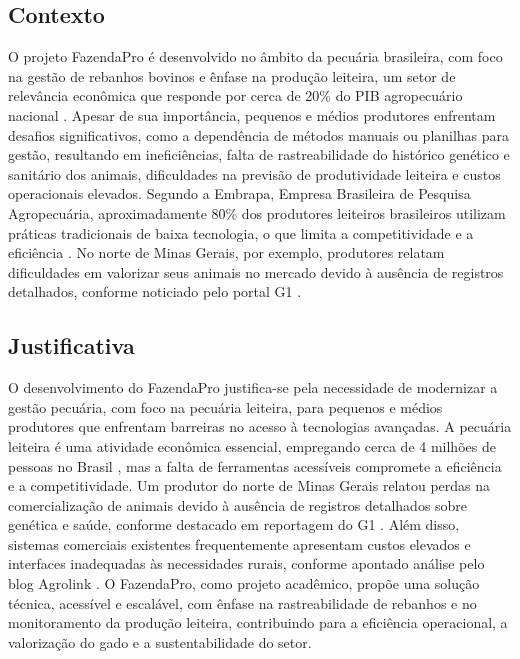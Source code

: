 \documentclass[12pt, a4paper]{article}
\begin{document}
\subsection{Contexto}
\begin{spacing}{1.5}
O projeto FazendaPro é desenvolvido no âmbito da pecuária brasileira, com foco na gestão de rebanhos bovinos e ênfase na produção leiteira, um setor de relevância econômica que responde por cerca de 20\% do PIB agropecuário nacional \cite{agro20}. Apesar de sua importância, pequenos e médios produtores enfrentam desafios significativos, como a dependência de métodos manuais ou planilhas para gestão, resultando em ineficiências, falta de rastreabilidade do histórico genético e sanitário dos animais, dificuldades na previsão de produtividade leiteira e custos operacionais elevados. Segundo a Embrapa, Empresa Brasileira de Pesquisa Agropecuária,  aproximadamente 80\% dos produtores leiteiros brasileiros utilizam práticas tradicionais de baixa tecnologia, o que limita a competitividade e a eficiência \cite{anuario2023}. No norte de Minas Gerais, por exemplo, produtores relatam dificuldades em valorizar seus animais no mercado devido à ausência de registros detalhados, conforme noticiado pelo portal G1 \cite{g12022}.
\end{spacing}

\subsection{Justificativa}
\begin{spacing}{1.5}
O desenvolvimento do FazendaPro justifica-se pela necessidade de modernizar a gestão pecuária, com foco na pecuária leiteira, para pequenos e médios produtores que enfrentam barreiras no acesso à tecnologias avançadas. A pecuária leiteira é uma atividade econômica essencial, empregando cerca de 4 milhões de pessoas no Brasil \cite{4milhao}, mas a falta de ferramentas acessíveis compromete a eficiência e a competitividade. Um produtor do norte de Minas Gerais relatou perdas na comercialização de animais devido à ausência de registros detalhados sobre genética e saúde, conforme destacado em reportagem do G1 \cite{g12022}. Além disso, sistemas comerciais existentes frequentemente apresentam custos elevados e interfaces inadequadas às necessidades rurais, conforme apontado análise pelo blog Agrolink \cite{agropec2024}. O FazendaPro, como projeto acadêmico, propõe uma solução técnica, acessível e escalável, com ênfase na rastreabilidade de rebanhos e no monitoramento da produção leiteira, contribuindo para a eficiência operacional, a valorização do gado e a sustentabilidade do setor.
\end{spacing}
\end{document}
